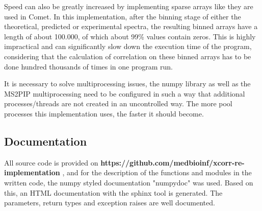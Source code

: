 \documentclass[11pt]{article}
\begin{document}
Speed can also be greatly increased by implementing sparse arrays like they are used in Comet. In this implementation, after the binning stage of either the theoretical, predicted or experimental spectra, the resulting binned arrays have a length of about 100.000, of which about 99\% values contain zeros. This is highly impractical and can significantly slow down the execution time of the program, considering that the calculation of correlation on these binned arrays has to be done hundred thousands of times in one program run.

It is necessary to solve multiprocessing issues, the numpy library as well as the MS2PIP multiprocessing need to be configured in such a way that additional processes/threads are not created in an uncontrolled way. The more pool processes this implementation uses, the faster it should become.

\subsection{Documentation} \label{documentation}
All source code is provided on \textbf{https://github.com/medbioinf/xcorr-re-implementation} , and for the description of the functions and modules in the written code, the numpy styled documentation "numpydoc" was used. Based on this, an HTML documentation with the sphinx tool is generated. The parameters, return types and exception raises are well documented.

\newpage

\printbibliography
\end{document}
